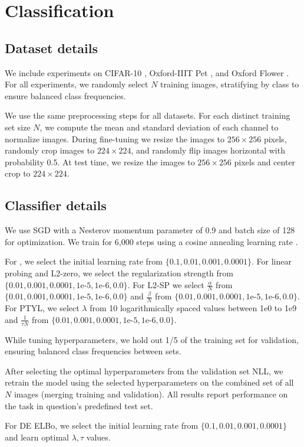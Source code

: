 \section{Classification}
\label{sec:classification}

\subsection{Dataset details}
\label{sec:dataset_details}
We include experiments on CIFAR-10 \citep{krizhevsky2010cifar}, Oxford-IIIT Pet \citep{parkhi2012cats}, and Oxford Flower \citep{nilsback2008automated}.
For all experiments, we randomly select $N$ training images, stratifying by class to ensure balanced class frequencies.

We use the same preprocessing steps for all datasets.
For each distinct training set size $N$, we compute the mean and standard deviation of each channel to normalize images.
During fine-tuning we resize the images to $256 \times 256$ pixels, randomly crop images to $224 \times 224$, and randomly flip images horizontal with probability 0.5.
At test time, we resize the images to $256 \times 256$ pixels and center crop to $224 \times 224$.

\subsection{Classifier details}
\label{sec:classifier_details}

We use SGD with a Nesterov momentum parameter of 0.9 and batch size of 128 for optimization.
We train for 6,000 steps using a cosine annealing learning rate \citep{loshchilov2016sgdr}.

For \baseline, we select the initial learning rate from $\{0.1, 0.01, 0.001, 0.0001\}$. 
For linear probing and L2-zero, we select the regularization strength from $\{0.01, 0.001, 0.0001, 1\text{e-}5, 1\text{e-}6, 0.0\}$.
For L2-SP we select $\frac{\alpha}{N}$ from $\{0.01, 0.001, 0.0001, 1\text{e-}5, 1\text{e-}6, 0.0\}$ and $\frac{\beta}{N}$ from $\{0.01, 0.001, 0.0001, 1\text{e-}5, 1\text{e-}6, 0.0\}$.
For PTYL, we select $\lambda$ from 10 logarithmically spaced values between 1e0 to 1e9 and $\frac{1}{\tau N}$ from $\{0.01, 0.001, 0.0001, 1\text{e-}5, 1\text{e-}6, 0.0\}$.

While tuning hyperparameters, we hold out 1/5 of the training set for validation, ensuring balanced class frequencies between sets.

After selecting the optimal hyperparameters from the validation set NLL, we retrain the model using the selected hyperparameters on the combined set of all $N$ images (merging training and validation). 
All results report performance on the task in question's predefined test set.

For DE ELBo, we select the initial learning rate from $\{0.1, 0.01, 0.001, 0.0001\}$ and learn optimal $\lambda, \tau$ values.
